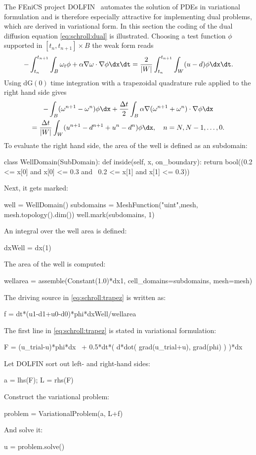 The FEniCS project DOLFIN~\citep{LoggWells2010} automates the solution
of PDEs in variational formulation and is therefore especially
attractive for implementing dual problems, which are derived in
variational form.  In this section the coding of the dual diffusion
equation
\eqref{eq:schroll:dual} is illustrated.
Choosing a test function $\phi$ supported in $[t_n, t_{n+1}] \times B$
the weak form reads
\begin{equation}
 - \int_{t_n}^{t_{n+1}} \int_B \omega_t \phi + \alpha \nabla \omega \cdot \nabla \phi \dx \dt =
 \frac{2}{|W|} \int_{t_n}^{t_{n+1}} \int_W (u-d) \phi \dx \dt .
\end{equation}
Using $\mathrm{dG}(0)$ time integration with a trapezoidal quadrature rule applied to the right hand side gives
\begin{multline} \label{eq:schroll:trapez}
 - \int_B (\omega^{n+1}-\omega^n) \phi \dx
     + \frac{\Delta t}{2} \int_B \alpha \nabla(\omega^{n+1}+\omega^n) \cdot \nabla \phi \dx
\\
 = \frac{\Delta t}{|W|} \int_W (u^{n+1} - d^{n+1} +u^n -d^n) \phi \dx,
 \quad n = N, N-1,\ldots, 0 .
\end{multline}
To evaluate the right hand side, the area of the well is defined as an subdomain:
\begin{python}
 class WellDomain(SubDomain):
     def inside(self, x, on_boundary):
         return bool((0.2 <= x[0] and x[0] <= 0.3 and \
                      0.2 <= x[1] and x[1] <= 0.3))
\end{python}
Next, it gets marked:
\begin{python}
 well = WellDomain()
 subdomains = MeshFunction("uint",mesh, mesh.topology().dim())
 well.mark(subdomains, 1)
\end{python}
An integral over the well area is defined:
\begin{python}
 dxWell = dx(1)
\end{python}
The area of the well is computed:
\begin{python}
wellarea = assemble(Constant(1.0)*dx1, cell_domains=subdomains, mesh=mesh)
\end{python}
The driving source in \eqref{eq:schroll:trapez} is written as:
\begin{python}
 f = dt*(u1-d1+u0-d0)*phi*dxWell/wellarea
\end{python}
The first line in \eqref{eq:schroll:trapez} is stated in variational formulation:
\begin{python}
 F = (u_trial-u)*phi*dx \
   + 0.5*dt*( d*dot( grad(u_trial+u), grad(phi) ) )*dx
\end{python}
Let DOLFIN sort out left- and right-hand sides:
\begin{python}
 a = lhs(F); L = rhs(F)
\end{python}
Construct the variational problem:
\begin{python}
 problem = VariationalProblem(a, L+f)
\end{python}
And solve it:
\begin{python}
 u = problem.solve()
\end{python}


